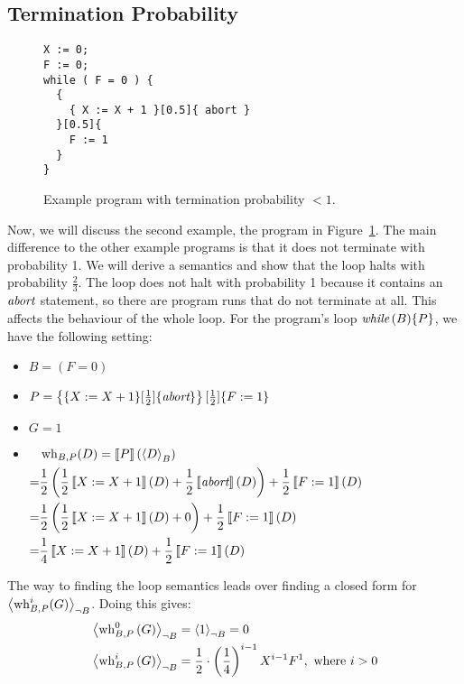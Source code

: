 \subsection{Termination Probability}
\begin{figure}[t]
	\centering
	\begin{minipage}[t]{0.5\textwidth}
		\begin{lstlisting}[label=prg:term_prob, caption=\ ]
X := 0;
F := 0;
while ( F = 0 ) {
  {
    { X := X + 1 }[0.5]{ abort }
  }[0.5]{
    F := 1
  }
}
		\end{lstlisting}
	\end{minipage}
	\caption{Example program with termination probability $< 1$.
	\label{fig:termin_prob_lt_1}}
\end{figure}
Now, we will discuss the second example, the program in Figure~\ref{fig:termin_prob_lt_1}.
The main difference to the other example programs is that it does not terminate with probability 1.
We will derive a semantics and show that the loop halts with probability $\frac{2}{3}$.
The loop does not halt with probability 1 because it contains an $\textit{abort}$ statement, so there are program runs that do not terminate at all.
This affects the behaviour of the whole loop.
For the program's loop $\textit{while}\,(B) \{P\}$, we have the following setting:
\begin{itemize}
	\item $B = (F = 0)$
	\item $P = \left\{ \{ X := X + 1 \}[\frac{1}{2}]\{ \textit{abort} \} \right\} [\frac{1}{2}] \{ F := 1 \}$
	\item $G = 1$
	\item $\begin{aligned}[t]
		 & \operatorname{wh}_{B, P}(D) = \left\llbracket P \right\rrbracket(\left\langle D \right\rangle_{B}) \\
		=& \frac{1}{2} \left( \frac{1}{2} \left\llbracket X := X + 1 \right\rrbracket(D) + \frac{1}{2} \left\llbracket \textit{abort} \right\rrbracket(D) \right)
			+ \frac{1}{2} \left\llbracket F := 1 \right\rrbracket(D) \\
		=& \frac{1}{2} \left( \frac{1}{2} \left\llbracket X := X + 1 \right\rrbracket(D) + 0 \right) + \frac{1}{2} \left\llbracket F := 1 \right\rrbracket(D) \\
		=& \frac{1}{4} \left\llbracket X := X + 1 \right\rrbracket(D) + \frac{1}{2} \left\llbracket F := 1 \right\rrbracket(D)
		\end{aligned}$
\end{itemize}
The way to finding the loop semantics leads over finding a closed form for $\left\langle \operatorname{wh}_{B, P}^i(G) \right\rangle_{\lnot B}$.
Doing this gives:
\begin{align*}
	& \left\langle \operatorname{wh}_{B, P}^0 \left(G\right) \right\rangle_{\lnot B} = \left\langle 1 \right\rangle_{\lnot B} = 0 \\
	& \left\langle \operatorname{wh}_{B, P}^i \left(G\right) \right\rangle_{\lnot B}
		= \frac{1}{2} \cdot \left(\frac{1}{4}\right)^{i-1} X^{i-1} F^1 , \text{ where } i > 0
\end{align*}
